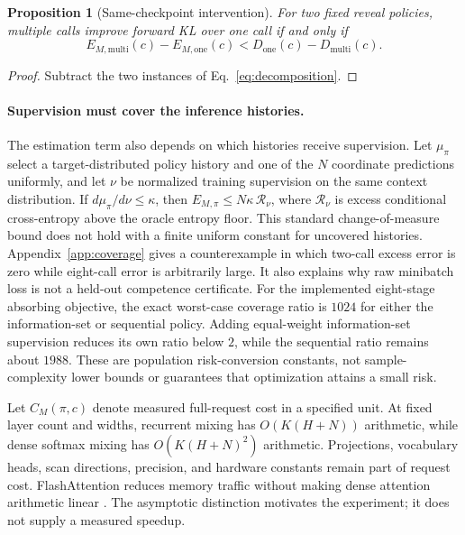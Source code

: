 \documentclass{article}
\newtheorem{proposition}{Proposition}
\begin{document}
\begin{proposition}[Same-checkpoint intervention]
For two fixed reveal policies, multiple calls improve forward KL over one call
if and only if
\begin{equation}
 E_{M,\mathrm{multi}}(c)-E_{M,\mathrm{one}}(c)
 <D_{\mathrm{one}}(c)-D_{\mathrm{multi}}(c).
 \label{eq:intervention}
\end{equation}
\end{proposition}
\begin{proof}
Subtract the two instances of Eq.~\eqref{eq:decomposition}.
\end{proof}

\paragraph{Supervision must cover the inference histories.}
The estimation term also depends on which histories receive supervision.
Let $\mu_\pi$ select a target-distributed policy history and one of the $N$
coordinate predictions uniformly, and let $\nu$ be normalized training
supervision on the same context distribution. If
$d\mu_\pi/d\nu\le\kappa$, then
$E_{M,\pi}\le N\kappa\,\mathcal R_\nu$, where $\mathcal R_\nu$ is excess
conditional cross-entropy above the oracle entropy floor. This standard
change-of-measure bound does not hold with a finite uniform constant for
uncovered histories. Appendix~\ref{app:coverage} gives a counterexample in
which two-call excess error is zero while eight-call error is arbitrarily large.
It also explains why raw minibatch loss is not a held-out competence certificate.
For the implemented eight-stage absorbing objective, the exact worst-case
coverage ratio is $1024$ for either the information-set or sequential policy.
Adding equal-weight information-set supervision reduces its own ratio below
$2$, while the sequential ratio remains about $1988$.
These are population risk-conversion constants, not sample-complexity lower
bounds or guarantees that optimization attains a small risk.


Let $C_M(\pi,c)$ denote measured full-request cost in a specified unit. At fixed
layer count and widths, recurrent mixing has $O(K(H+N))$ arithmetic, while
dense softmax mixing has $O(K(H+N)^2)$ arithmetic. Projections, vocabulary heads,
scan directions, precision, and hardware constants remain part of request
cost. FlashAttention reduces memory traffic without making dense attention
arithmetic linear \citep{flashattention}. The asymptotic distinction motivates
the experiment; it does not supply a measured speedup.
\end{document}
